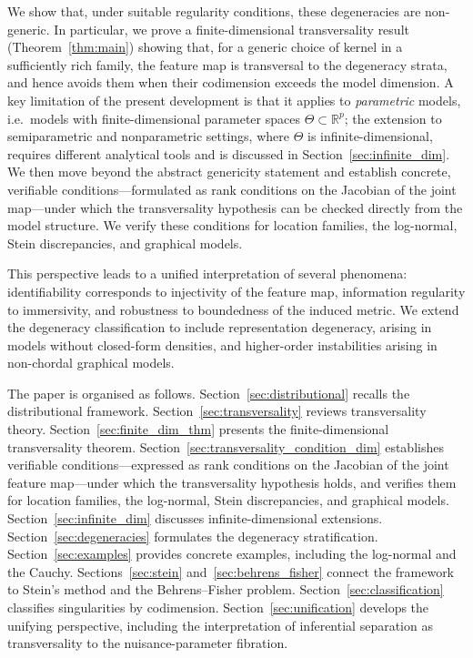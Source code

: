 \documentclass[11pt,a4paper]{article}
\newcommand{\R}{\mathbb{R}}
\begin{document}
We show that, under suitable regularity conditions, these degeneracies are
non-generic. In particular, we prove a finite-dimensional transversality result
(Theorem~\ref{thm:main}) showing that, for a generic choice
of kernel in a sufficiently rich family, the feature map is transversal to the
degeneracy strata, and hence avoids them when their codimension exceeds the
model dimension.  A key limitation of the present development is that it applies
to \emph{parametric} models, i.e.\ models with finite-dimensional parameter
spaces $\Theta \subset \R^p$; the extension to semiparametric and nonparametric
settings, where $\Theta$ is infinite-dimensional, requires different analytical
tools and is discussed in Section~\ref{sec:infinite_dim}.
We then move beyond the abstract genericity statement and
establish concrete, verifiable conditions---formulated as rank conditions on the
Jacobian of the joint map---under which the transversality hypothesis can be
checked directly from the model structure.  We verify these conditions for
location families, the log-normal, Stein discrepancies, and graphical models.

This perspective leads to a unified interpretation of several phenomena:
identifiability corresponds to injectivity of the feature map, information
regularity to immersivity, and robustness to boundedness of the induced metric.
We extend the degeneracy classification to include representation degeneracy,
arising in models without closed-form densities, and higher-order instabilities
arising in non-chordal graphical models.

The paper is organised as follows.
Section~\ref{sec:distributional} recalls the distributional framework.
Section~\ref{sec:transversality} reviews transversality theory.
Section~\ref{sec:finite_dim_thm} presents the finite-dimensional
transversality theorem.
Section~\ref{sec:transversality_condition_dim} establishes verifiable
conditions---expressed as rank conditions on the Jacobian of the joint
feature map---under which the transversality hypothesis holds, and
verifies them for location families, the log-normal, Stein
discrepancies, and graphical models.
Section~\ref{sec:infinite_dim} discusses infinite-dimensional
extensions.
Section~\ref{sec:degeneracies} formulates the degeneracy
stratification.
Section~\ref{sec:examples} provides concrete examples, including the
log-normal and the Cauchy.
Sections~\ref{sec:stein} and~\ref{sec:behrens_fisher} connect the
framework to Stein’s method and the Behrens--Fisher problem.
Section~\ref{sec:classification} classifies singularities by
codimension.
Section~\ref{sec:unification} develops the unifying perspective,
including the interpretation of inferential separation as
transversality to the nuisance-parameter fibration.
\end{document}
